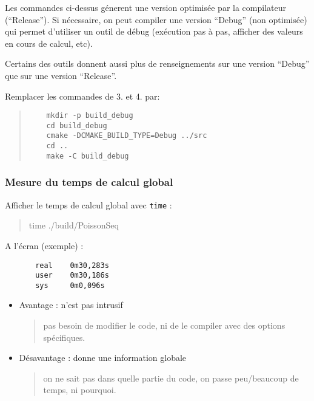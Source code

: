 \documentclass{beamer}
\begin{document}
\begin{frame}[fragile]
\vfill
Les commandes ci-dessus g\'enerent une version optimis\'ee par la compilateur (``Release''). Si n\'ecessaire, on peut compiler une version ``Debug'' (non optimis\'ee)
qui permet d'utiliser un outil de d\'ebug (ex\'ecution pas \`a pas, afficher des valeurs en cours de calcul, etc).
\vfill

Certains des outils donnent aussi plus de renseignements sur une version ``Debug'' que sur une version ``Release''.
\vfill

Remplacer les commandes de 3. et 4. par:
	\begin{quote}
	\begin{verbatim}
	mkdir -p build_debug
	cd build_debug
	cmake -DCMAKE_BUILD_TYPE=Debug ../src
	cd ..
	make -C build_debug
	\end{verbatim}
\end{quote}
\vfill

\end{frame}

\begin{frame}[fragile]
	\frametitle{Mesure du temps de calcul global}
    \vfill
	Afficher le temps de calcul global avec {\tt time} :
		\begin{quote}
	       time ./build/PoissonSeq
        \end{quote}
	
	A l'\'ecran (exemple) :\begin{minipage}[t]{4cm}
	\begin{verbatim}
	   real    0m30,283s
	   user    0m30,186s
	   sys     0m0,096s
	\end{verbatim}
	\end{minipage}

    \vfill
	\begin{itemize}
		\item Avantage : n'est pas intrusif
		\begin{quote}
			pas besoin de modifier le code, ni de le compiler avec des options sp\'ecifiques.
		\end{quote} 
		\item D\'esavantage : donne une information globale
		\begin{quote}
			on ne sait pas dans quelle partie du code, on passe peu/beaucoup de temps, ni pourquoi.
		\end{quote} 
	\end{itemize}
    \vfill
\end{frame}
\end{document}
